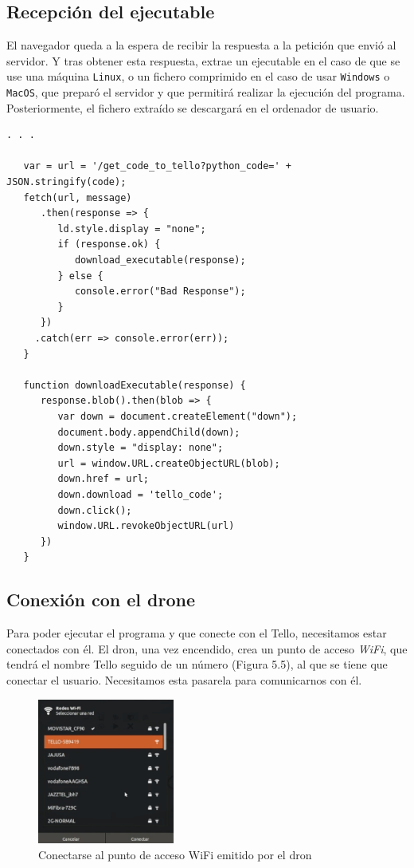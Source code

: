 \documentclass{report}
\begin{document}
\subsection{Recepción del ejecutable}

El navegador queda a la espera de recibir la respuesta a la petición que envió al servidor. Y tras obtener esta respuesta, extrae un ejecutable en el caso de que se use una máquina \texttt{Linux}, o un fichero comprimido en el caso de usar \texttt{Windows} o \texttt{MacOS}, que preparó el servidor y que permitirá realizar la ejecución del programa.  Posteriormente, el fichero extraído se descargará en el ordenador de usuario.
\\
\begin{lstlisting}[frame=single,breaklines=true, label=Extracción del empaquetado, caption=Extracción empaquetado,  captionpos=b]
   . . .
   
   var = url = '/get_code_to_tello?python_code=' + JSON.stringify(code);
   fetch(url, message)
      .then(response => {
         ld.style.display = "none";
         if (response.ok) {
            download_executable(response);
         } else {
            console.error("Bad Response");
         }
      })
     .catch(err => console.error(err));
   }
   
   function downloadExecutable(response) {
      response.blob().then(blob => {
         var down = document.createElement("down");
         document.body.appendChild(down);
         down.style = "display: none";
         url = window.URL.createObjectURL(blob);
         down.href = url;
         down.download = 'tello_code';
         down.click();
         window.URL.revokeObjectURL(url)
      })
   }
\end{lstlisting}

\subsection{Conexión con el drone}

Para poder ejecutar el programa y que conecte con el Tello, necesitamos estar conectados con él. El dron, una vez encendido, crea un punto de acceso \textit{WiFi}, que tendrá el nombre Tello seguido de un número (Figura 5.5), al que se tiene que conectar el usuario. Necesitamos esta pasarela para comunicarnos con él.
\\
\begin{figure}[h!]
	\centering
    	\includegraphics[width=0.4\textwidth]{images/seleccionar_wifi_tello.png}
  	\caption{Conectarse al punto de acceso WiFi emitido por el dron}
  	\label{Conectarse al punto de acceso WiFi emitido por el dron}
\end{figure}
\end{document}

